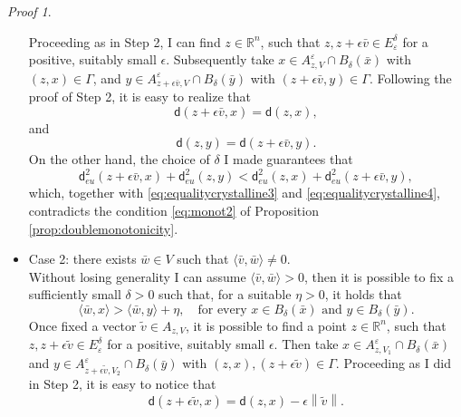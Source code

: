 \documentclass[11pt,twoside,a4paper]{article}
\newcommand{\scal}[2]{\ensuremath{\langle #1 , #2 \rangle}} %
\newcommand{\norm}[1]{\left\lVert#1\right\rVert}
\newcommand{\R}{\mathbb{R}}
\newcommand{\thmsymbol}{\( \square \)}
\newcommand{\di}{\mathsf d} %
\theoremstyle{theorem}
\theoremstyle{definition}
\theoremstyle{remark}
\theoremstyle{proof}
\newtheorem*{pro}{Proof}
\newenvironment{pr}{\begin{pro}%
 \renewcommand{\qedsymbol}{\thmsymbol}\pushQED{\qed}}%
 {\popQED\end{pro}}
\begin{document}
\begin{pr}
\begin{itemize}
\begin{equation*}
    \end{equation*}
    Proceeding as in Step 2, I can find $z\in \R^n$, such that $z, z + \epsilon \bar v \in E_\varepsilon^\delta$ for a positive, suitably small $\epsilon$. Subsequently take $x\in A_{z,V}^\varepsilon\cap B_\delta(\bar x)$ with $(z,x)\in \Gamma$, and $y\in A_{z+\epsilon \bar v,V}^\varepsilon \cap B_\delta(\bar y)$ with $(z+\epsilon \bar v,y)\in \Gamma$. Following the proof of Step 2, it is easy to realize that  
    \begin{equation}\label{eq:equalitycrystalline3}
        \di(z+\epsilon \bar v, x) = \di (z, x),
    \end{equation}
    and 
    \begin{equation}\label{eq:equalitycrystalline4}
         \di (z, y)=\di(z+\epsilon \bar v, y).
    \end{equation}
    On the other hand, the choice of $\delta$ I made guarantees that 
    \begin{equation*}
        \di_{eu}^2(z+\epsilon \bar v, x) + \di_{eu}^2(z,y) <\di_{eu}^2 (z,x) + \di_{eu}^2(z+\epsilon \bar v, y),
    \end{equation*}
    which, together with \eqref{eq:equalitycrystalline3} and \eqref{eq:equalitycrystalline4}, contradicts the condition \eqref{eq:monot2} of Proposition \ref{prop:doublemonotonicity}.
    \item Case 2: there exists $\bar w \in V$ such that $\scal{\bar v}{\bar w}\ne 0$.\\
    Without losing generality I can assume $\scal{\bar v}{\bar w}> 0$, then it is possible to fix a sufficiently small $\delta>0$ such that, for a suitable $\eta>0$, it holds that
     \begin{equation*}
        \scal{\bar w}{x}> \scal{\bar w}{y}+\eta, \quad \text{for every } x \in B_\delta (\bar x) \text{ and } y \in B_\delta (\bar y). 
    \end{equation*}
    Once fixed a vector $\tilde v \in A_{z,V}$, it is possible to find a point $z\in \R^n$, such that $z,z+\epsilon\tilde v \in E_\varepsilon^\delta$ for a positive, suitably small $\epsilon$. Then take $x\in A_{z,V_1}^\varepsilon\cap B_\delta(\bar x)$ and $y\in A_{z+\epsilon \tilde v,V_2}^\varepsilon \cap B_\delta(\bar y)$ with $(z,x),(z+\epsilon\tilde v)\in \Gamma$. Proceeding as I did in Step 2, it is easy to notice that 
   \begin{equation}\label{eq:exactnorm2}
       \di (z+\epsilon\tilde v, x) = \di (z,x) - \epsilon \norm{\tilde v}.
   \end{equation}

\end{itemize}
\end{pr}
\end{document}
